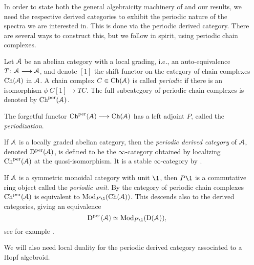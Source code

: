 In order to state both the general algebraicity machinery of \cite{patchkoria-pstragowski_2021} and our results, we need the respective derived categories to exhibit the periodic nature of the spectra we are interested in. This is done via the periodic derived category. There are several ways to construct this, but we follow \cite{franke_96} in spirit, using periodic chain complexes. 

\begin{definition}
    \label{ch1:def:periodic-chain-complex}
    Let $\EuScript{A}$ be an abelian category with a local grading, i.e., an auto-equivalence $T\colon \EuScript{A}\longrightarrow\EuScript{A}$, and denote $[1]$ the shift functor on the category of chain complexes $\mathrm{Ch}(\EuScript{A})$ in $\EuScript{A}$. A chain complex $C\in \mathrm{Ch}(\EuScript{A})$ is called \emph{periodic} if there is an isomorphism $\phi\: C[1]\longrightarrow TC$. The full subcategory of periodic chain complexes is denoted by $\mathrm{Ch}^{\mathrm{per}}(\EuScript{A})$. 
\end{definition}

\begin{definition}
    The forgetful functor $\mathrm{Ch}^{\mathrm{per}}(\EuScript{A})\longrightarrow \mathrm{Ch}(\EuScript{A})$ has a left adjoint $P$, called the \emph{periodization}. 
\end{definition}

\begin{definition}
    \label{ch1:def:periodic-derived-category}
    If $\EuScript{A}$ is a locally graded abelian category, then the \emph{periodic derived category} of $\EuScript{A}$, denoted $\mathrm{D}^{\mathrm{per}}(\EuScript{A})$, is defined to be the $\infty$-category obtained by localizing $\mathrm{Ch}^{\mathrm{per}}(\EuScript{A})$ at the quasi-isomorphism. It is a stable $\infty$-category by \cite[7.8]{patchkoria-pstragowski_2021}. 
\end{definition}

\begin{remark}
    \label{ch1:rm:periodic-derived-as-modules}
    If $\EuScript{A}$ is a symmetric monoidal category with unit $\1$, then $P\1$ is a commutative ring object called the \emph{periodic unit}. By \cite[2.3]{barnes-roitzheim_2011} the category of periodic chain complexes $\mathrm{Ch}^{\mathrm{per}}(\EuScript{A})$ is equivalent to $\Mod_{P\1}(\Ch(\A))$. This descends also to the derived categories, giving an equivalence 
    \[\Dper(\A)\simeq \Mod_{P\1}(\Der(\A)),\]
    see for example \cite[3.7]{pstragowski_2021}. 
\end{remark}

We will also need local duality  for the periodic derived category associated to a Hopf algebroid. 

